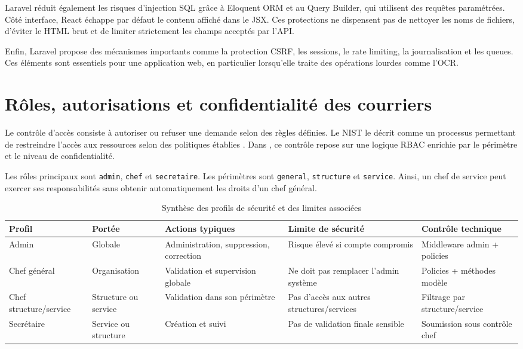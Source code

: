 Laravel réduit également les risques d'injection SQL grâce à Eloquent ORM et au Query Builder, qui utilisent des requêtes paramétrées. Côté interface, React échappe par défaut le contenu affiché dans le JSX. Ces protections ne dispensent pas de nettoyer les noms de fichiers, d'éviter le HTML brut et de limiter strictement les champs acceptés par l'API.

Enfin, Laravel propose des mécanismes importants comme la protection CSRF, les sessions, le rate limiting, la journalisation et les queues. Ces éléments sont essentiels pour une application web, en particulier lorsqu'elle traite des opérations lourdes comme l'OCR.

\section{Rôles, autorisations et confidentialité des courriers}
\label{sec:roles-autorisations-confidentialite}

Le contrôle d'accès consiste à autoriser ou refuser une demande selon des règles définies. Le NIST le décrit comme un processus permettant de restreindre l'accès aux ressources selon des politiques établies \cite{nist-access}. Dans \SecurityAppName{}, ce contrôle repose sur une logique RBAC enrichie par le périmètre et le niveau de confidentialité.

Les rôles principaux sont \texttt{admin}, \texttt{chef} et \texttt{secretaire}. Les périmètres sont \texttt{general}, \texttt{structure} et \texttt{service}. Ainsi, un chef de service peut exercer ses responsabilités sans obtenir automatiquement les droits d'un chef général.

\begin{table}[H]
\centering
\small
\begin{tabularx}{\textwidth}{lXXXX}
\toprule
\textbf{Profil} & \textbf{Portée} & \textbf{Actions typiques} & \textbf{Limite de sécurité} & \textbf{Contrôle technique} \\
\midrule
Admin & Globale & Administration, suppression, correction & Risque élevé si compte compromis & Middleware admin + policies \\
Chef général & Organisation & Validation et supervision globale & Ne doit pas remplacer l'admin système & Policies + méthodes modèle \\
Chef structure/service & Structure ou service & Validation dans son périmètre & Pas d'accès aux autres structures/services & Filtrage par structure/service \\
Secrétaire & Service ou structure & Création et suivi & Pas de validation finale sensible & Soumission sous contrôle chef \\
\bottomrule
\end{tabularx}
\caption{Synthèse des profils de sécurité et des limites associées}
\label{tab:profils-securite}
\end{table}

